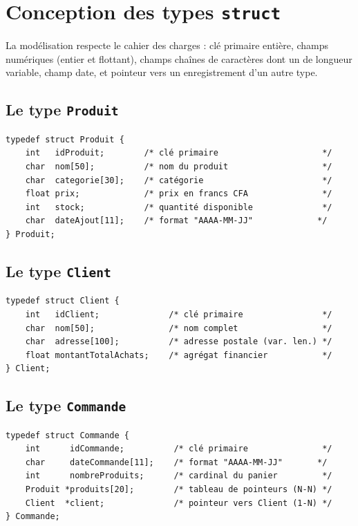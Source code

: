 \documentclass[12pt,a4paper]{report}
\begin{document}
\section{Conception des types \texttt{struct}}

La modélisation respecte le cahier des charges : clé primaire entière, champs numériques (entier et flottant), champs chaînes de caractères dont un de longueur variable, champ date, et pointeur vers un enregistrement d'un autre type.

\subsection{Le type \texttt{Produit}}

\begin{lstlisting}[caption={Définition du type \texttt{Produit}}, label=lst:produit]
typedef struct Produit {
    int   idProduit;        /* clé primaire                     */
    char  nom[50];          /* nom du produit                   */
    char  categorie[30];    /* catégorie                        */
    float prix;             /* prix en francs CFA               */
    int   stock;            /* quantité disponible              */
    char  dateAjout[11];    /* format "AAAA-MM-JJ"             */
} Produit;
\end{lstlisting}

\subsection{Le type \texttt{Client}}

\begin{lstlisting}[caption={Définition du type \texttt{Client}}, label=lst:client]
typedef struct Client {
    int   idClient;              /* clé primaire                */
    char  nom[50];               /* nom complet                 */
    char  adresse[100];          /* adresse postale (var. len.) */
    float montantTotalAchats;    /* agrégat financier           */
} Client;
\end{lstlisting}

\subsection{Le type \texttt{Commande}}

\begin{lstlisting}[caption={Définition du type \texttt{Commande}}, label=lst:commande]
typedef struct Commande {
    int      idCommande;          /* clé primaire               */
    char     dateCommande[11];    /* format "AAAA-MM-JJ"       */
    int      nombreProduits;      /* cardinal du panier         */
    Produit *produits[20];        /* tableau de pointeurs (N-N) */
    Client  *client;              /* pointeur vers Client (1-N) */
} Commande;
\end{lstlisting}
\end{document}

